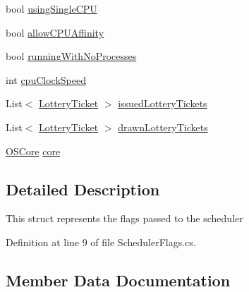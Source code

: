 \begin{DoxyCompactItemize}
\item 
bool \hyperlink{struct_c_p_u___o_s___simulator_1_1_operating___system_1_1_scheduler_flags_a7b42d8ef49035b7d450032a1e4060fb6}{using\+Single\+C\+P\+U}
\item 
bool \hyperlink{struct_c_p_u___o_s___simulator_1_1_operating___system_1_1_scheduler_flags_ad2d1f81a34e9cce1553bfdf8e8a719ea}{allow\+C\+P\+U\+Affinity}
\item 
bool \hyperlink{struct_c_p_u___o_s___simulator_1_1_operating___system_1_1_scheduler_flags_a1a46dce1e8818f1dae579c00eed21ad1}{running\+With\+No\+Processes}
\item 
int \hyperlink{struct_c_p_u___o_s___simulator_1_1_operating___system_1_1_scheduler_flags_a3ce064f3abe5ac1762f0e7bbfab2eee5}{cpu\+Clock\+Speed}
\item 
List$<$ \hyperlink{class_c_p_u___o_s___simulator_1_1_operating___system_1_1_lottery_ticket}{Lottery\+Ticket} $>$ \hyperlink{struct_c_p_u___o_s___simulator_1_1_operating___system_1_1_scheduler_flags_afb4de8c16fd93a7e44acddfa4c2484f2}{issued\+Lottery\+Tickets}
\item 
List$<$ \hyperlink{class_c_p_u___o_s___simulator_1_1_operating___system_1_1_lottery_ticket}{Lottery\+Ticket} $>$ \hyperlink{struct_c_p_u___o_s___simulator_1_1_operating___system_1_1_scheduler_flags_a215ea3393e8df669cbe8c2133ba768c8}{drawn\+Lottery\+Tickets}
\item 
\hyperlink{class_c_p_u___o_s___simulator_1_1_operating___system_1_1_o_s_core}{O\+S\+Core} \hyperlink{struct_c_p_u___o_s___simulator_1_1_operating___system_1_1_scheduler_flags_a8640b28c0b54ac561e0b6b3882763471}{core}
\end{DoxyCompactItemize}


\subsection{Detailed Description}
This struct represents the flags passed to the scheduler 



Definition at line 9 of file Scheduler\+Flags.\+cs.



\subsection{Member Data Documentation}
\hypertarget{struct_c_p_u___o_s___simulator_1_1_operating___system_1_1_scheduler_flags_ad2d1f81a34e9cce1553bfdf8e8a719ea}{}
